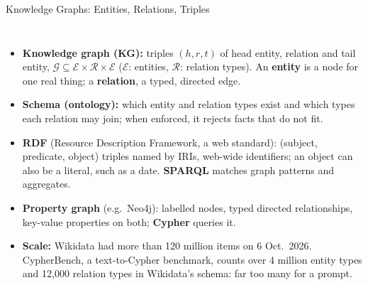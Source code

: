 \begin{frame}[fragile]{Knowledge Graphs: Entities, Relations, Triples}
  \begin{columns}[T,onlytextwidth]
      \begin{itemize}\footnotesize\itemsep0.3em
        \item[\textcolor{red}{$\blacktriangleright$}] \textbf{Knowledge graph (KG):} triples $(h, r, t)$ of head entity, relation and tail entity, $\mathcal{G} \subseteq \mathcal{E} \times \mathcal{R} \times \mathcal{E}$ ($\mathcal{E}$: entities, $\mathcal{R}$: relation types). An \textbf{entity} is a node for one real thing; a \textbf{relation}, a typed, directed edge.
        \item[\textcolor{red}{$\blacktriangleright$}] \textbf{Schema (ontology):} which entity and relation types exist and which types each relation may join; when enforced, it rejects facts that do not fit.
        \item[\textcolor{red}{$\blacktriangleright$}] \textbf{RDF} (Resource Description Framework, a web standard): (subject, predicate, object) triples named by IRIs, web-wide identifiers; an object can also be a literal, such as a date. \textbf{SPARQL} matches graph patterns and aggregates.
        \item[\textcolor{red}{$\blacktriangleright$}] \textbf{Property graph} (e.g.\ Neo4j): labelled nodes, typed directed relationships, key-value properties on both; \textbf{Cypher} queries it.
        \item[\textcolor{red}{$\blacktriangleright$}] \textbf{Scale:} Wikidata had more than 120 million items on 6 Oct.\ 2026. CypherBench, a text-to-Cypher benchmark, counts over 4 million entity types and 12{,}000 relation types in Wikidata's schema: far too many for a prompt.
      \end{itemize}
      \centering
\end{columns}
\end{frame}
